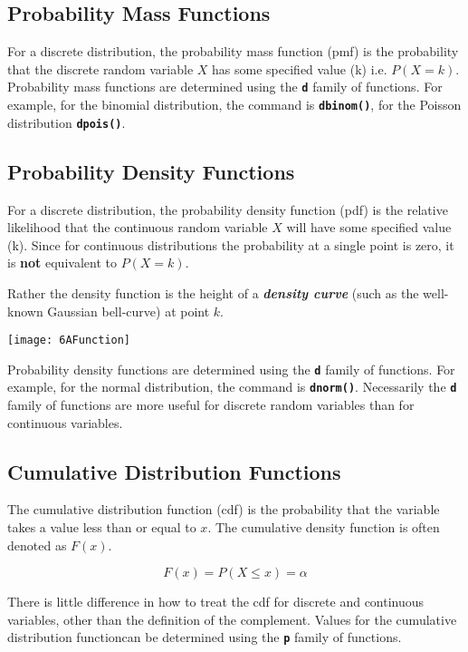 \subsection{Probability Mass Functions} 

For a discrete distribution, the probability mass function (pmf) is the probability that the discrete random variable $X$ has some specified value (k) i.e. $P(X = k)$. Probability mass functions are determined using the \texttt{\textbf{d}} family of functions. For example, for the binomial distribution, the command is \texttt{\textbf{dbinom()}}, for the Poisson distribution \texttt{\textbf{dpois()}}. 

\subsection{Probability Density Functions} 
For a discrete distribution, the probability density function (pdf) is the relative likelihood that the continuous random variable $X$ will have some specified value (k).
Since for continuous distributions the probability at a single point is zero, it is \textbf{not} equivalent to $P(X = k)$.

Rather the density function is the height of a \textbf{\textit{density curve}} (such as the well-known Gaussian bell-curve) at point $k$.

\begin{center}
\texttt{[image: 6AFunction]}
\end{center}
 
%
 
Probability density functions are determined using the \texttt{\textbf{d}} family of functions. For example, for the normal distribution, the command is \texttt{\textbf{dnorm()}}. 
Necessarily the  \texttt{\textbf{d}} family of functions are more useful for discrete random variables than for continuous variables.

\subsection{Cumulative Distribution Functions}

The cumulative distribution function (cdf) is the probability that the variable takes a value less than or equal to $x$. The cumulative density function is often denoted as $F(x)$.
 
 \[F(x)= P(X \leq x) = \alpha \]

There is little difference in how to treat the cdf for discrete and continuous variables, other than the definition of the complement.
Values for the cumulative distribution functioncan be determined using the \texttt{\textbf{p}} family of functions. 

